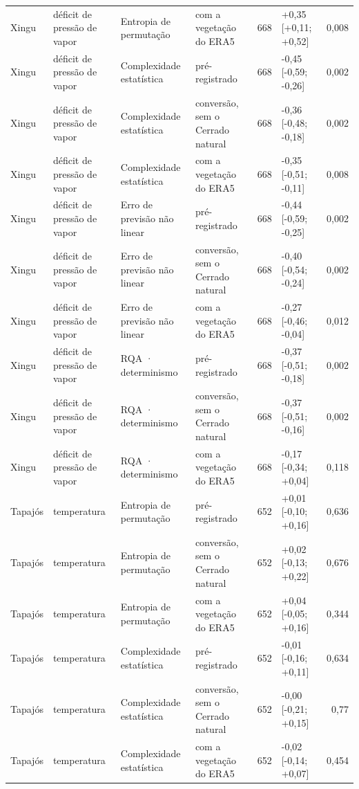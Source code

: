 \begin{table}
{\begin{tabular}{llllrlr}
Xingu & déficit de pressão de vapor & Entropia de permutação & com a vegetação do ERA5 & 668 & +0,35 [+0,11; +0,52] & 0,008 \\
Xingu & déficit de pressão de vapor & Complexidade estatística & pré-registrado & 668 & -0,45 [-0,59; -0,26] & 0,002 \\
Xingu & déficit de pressão de vapor & Complexidade estatística & conversão, sem o Cerrado natural & 668 & -0,36 [-0,48; -0,18] & 0,002 \\
Xingu & déficit de pressão de vapor & Complexidade estatística & com a vegetação do ERA5 & 668 & -0,35 [-0,51; -0,11] & 0,008 \\
Xingu & déficit de pressão de vapor & Erro de previsão não linear & pré-registrado & 668 & -0,44 [-0,59; -0,25] & 0,002 \\
Xingu & déficit de pressão de vapor & Erro de previsão não linear & conversão, sem o Cerrado natural & 668 & -0,40 [-0,54; -0,24] & 0,002 \\
Xingu & déficit de pressão de vapor & Erro de previsão não linear & com a vegetação do ERA5 & 668 & -0,27 [-0,46; -0,04] & 0,012 \\
Xingu & déficit de pressão de vapor & RQA · determinismo & pré-registrado & 668 & -0,37 [-0,51; -0,18] & 0,002 \\
Xingu & déficit de pressão de vapor & RQA · determinismo & conversão, sem o Cerrado natural & 668 & -0,37 [-0,51; -0,16] & 0,002 \\
Xingu & déficit de pressão de vapor & RQA · determinismo & com a vegetação do ERA5 & 668 & -0,17 [-0,34; +0,04] & 0,118 \\
Tapajós & temperatura & Entropia de permutação & pré-registrado & 652 & +0,01 [-0,10; +0,16] & 0,636 \\
Tapajós & temperatura & Entropia de permutação & conversão, sem o Cerrado natural & 652 & +0,02 [-0,13; +0,22] & 0,676 \\
Tapajós & temperatura & Entropia de permutação & com a vegetação do ERA5 & 652 & +0,04 [-0,05; +0,16] & 0,344 \\
Tapajós & temperatura & Complexidade estatística & pré-registrado & 652 & -0,01 [-0,16; +0,11] & 0,634 \\
Tapajós & temperatura & Complexidade estatística & conversão, sem o Cerrado natural & 652 & -0,00 [-0,21; +0,15] & 0,77 \\
Tapajós & temperatura & Complexidade estatística & com a vegetação do ERA5 & 652 & -0,02 [-0,14; +0,07] & 0,454 \\

\end{tabular}}
\end{table}
